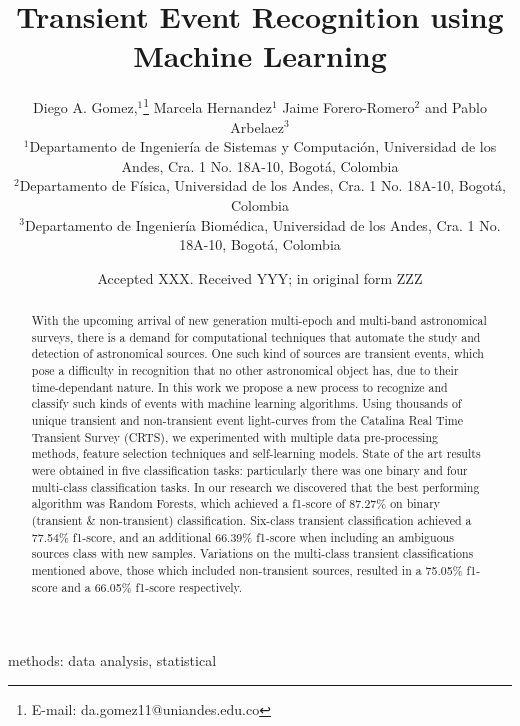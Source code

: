 \documentclass[a4paper,fleqn,usenatbib]{mnras}
\title[Transient Event Recognition using Machine Learning]{Transient Event Recognition using Machine Learning}
\author[Diego. A. Gomez et al.]{
Diego A. Gomez,$^{1}$\thanks{E-mail: da.gomez11@uniandes.edu.co}
Marcela Hernandez$^{1}$   
Jaime Forero-Romero$^{2}$
and Pablo Arbelaez$^{3}$
\\
$^{1}$Departamento de Ingenier\'ia de Sistemas y Computaci\'on, Universidad de los Andes, Cra. 1 No. 18A-10, Bogot\'a, Colombia\\
$^{2}$Departamento de F\'isica, Universidad de los Andes, Cra. 1 No. 18A-10, Bogot\'a, Colombia\\
$^{3}$Departamento de Ingenier\'ia Biom\'edica, Universidad de los Andes, Cra. 1 No. 18A-10, Bogot\'a, Colombia
}
\date{Accepted XXX. Received YYY; in original form ZZZ}
\begin{document}
\label{firstpage}
\pagerange{\pageref{firstpage}--\pageref{lastpage}}
\maketitle

\begin{abstract}



With the upcoming arrival of new generation multi-epoch and multi-band astronomical surveys, there is a demand for computational techniques that automate the study and detection of astronomical sources. One such kind of sources are transient events, which pose a difficulty in recognition that no other astronomical object has, due to their time-dependant nature. In this work we propose a new process to recognize and classify such kinds of events with machine learning algorithms. Using thousands of unique transient and non-transient event light-curves from the Catalina Real Time Transient Survey (CRTS), we experimented  with multiple data pre-processing methods, feature selection techniques and self-learning models. State of the art results were obtained in five classification tasks: particularly there was one binary and four multi-class classification tasks. In our research we discovered that the best performing algorithm was Random Forests, which achieved a f1-score of 87.27\% on binary (transient \& non-transient) classification. Six-class transient classification achieved a 77.54\% f1-score, and an additional 66.39\% f1-score when including an ambiguous sources class with new samples. Variations on the multi-class transient classifications mentioned above, those which included non-transient sources, resulted in a 75.05\% f1-score and a 66.05\% f1-score respectively. 

\end{abstract}

\begin{keywords}
methods: data analysis, statistical
\end{keywords}

\end{document}
